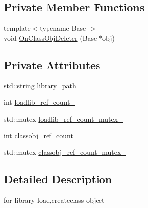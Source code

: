 \subsection*{Private Member Functions}
\begin{DoxyCompactItemize}
\item 
{\footnotesize template$<$typename Base $>$ }\\void \hyperlink{classapollo_1_1cyber_1_1class__loader_1_1ClassLoader_a779fe6d14fe1b895383bddfb260593f1}{On\-Class\-Obj\-Deleter} (Base $\ast$obj)
\end{DoxyCompactItemize}
\subsection*{Private Attributes}
\begin{DoxyCompactItemize}
\item 
std\-::string \hyperlink{classapollo_1_1cyber_1_1class__loader_1_1ClassLoader_ac2ce35233a9866b5ed83180b23ce6e16}{library\-\_\-path\-\_\-}
\item 
int \hyperlink{classapollo_1_1cyber_1_1class__loader_1_1ClassLoader_aa60b8b3da81bcfb874e6c5202522409f}{loadlib\-\_\-ref\-\_\-count\-\_\-}
\item 
std\-::mutex \hyperlink{classapollo_1_1cyber_1_1class__loader_1_1ClassLoader_adb3ba15dcff9f555885bcaf4be5f737d}{loadlib\-\_\-ref\-\_\-count\-\_\-mutex\-\_\-}
\item 
int \hyperlink{classapollo_1_1cyber_1_1class__loader_1_1ClassLoader_affd77449c6ff1c46e459d3e9c696ea7e}{classobj\-\_\-ref\-\_\-count\-\_\-}
\item 
std\-::mutex \hyperlink{classapollo_1_1cyber_1_1class__loader_1_1ClassLoader_af1ecab3d122a58aedea2029ca95a29ba}{classobj\-\_\-ref\-\_\-count\-\_\-mutex\-\_\-}
\end{DoxyCompactItemize}


\subsection{Detailed Description}
for library load,createclass object 

